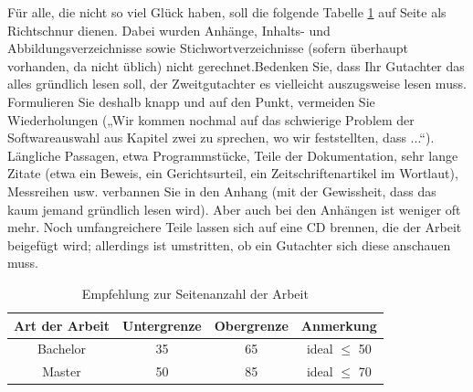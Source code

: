Für alle, die nicht so viel Glück haben, soll die folgende Tabelle \ref{tabelle-2} auf Seite \pageref{tabelle-2} als Richtschnur
dienen. Dabei wurden Anhänge, Inhalts- und Abbildungsverzeichnisse sowie Stichwortverzeichnisse (sofern überhaupt vorhanden, da nicht üblich) nicht gerechnet.Bedenken Sie, dass Ihr Gutachter das alles gründlich lesen soll, der Zweitgutachter es vielleicht
auszugsweise lesen muss. Formulieren Sie deshalb knapp und auf den Punkt, vermeiden Sie Wiederholungen („Wir kommen nochmal auf das schwierige Problem der Softwareauswahl aus
Kapitel zwei zu sprechen, wo wir feststellten, dass ...“).
Längliche Passagen, etwa Programmstücke, Teile der Dokumentation, sehr lange Zitate (etwa ein Beweis, ein Gerichtsurteil, ein Zeitschriftenartikel im Wortlaut), Messreihen usw.
verbannen Sie in den Anhang (mit der Gewissheit, dass das kaum jemand gründlich lesen wird).
Aber auch bei den Anhängen ist weniger oft mehr. Noch umfangreichere Teile lassen sich auf
eine CD brennen, die der Arbeit beigefügt wird; allerdings ist umstritten, ob ein Gutachter sich
diese anschauen muss.

\begin{table}[tb]
  \centering
  \begin{tabular}{|c|c|c|c|} \hline
    \textbf{Art der Arbeit} & \textbf{Untergrenze} & \textbf{Obergrenze} & \textbf{Anmerkung} \\ \hline
		\hline
    Bachelor & 35 & 65 & ideal $\leq$ 50 \\ \hline
    Master & 50 & 85 & ideal $\leq$ 70 \\ \hline
  \end{tabular}
  \caption{Empfehlung zur Seitenanzahl der Arbeit}
  \label{tabelle-2}
\end{table}


